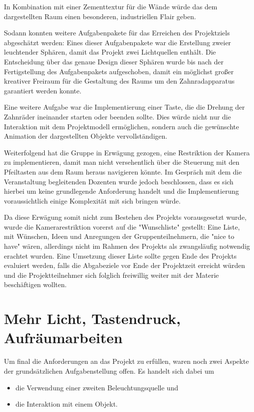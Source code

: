 \documentclass{article}
\begin{document}
In Kombination mit einer Zementtextur für die Wände würde das dem dargestellten Raum einen besonderen, industriellen Flair geben. 

Sodann konnten weitere Aufgabenpakete für das Erreichen des Projektziels abgeschätzt werden: 
Eines dieser Aufgabenpakete war die Erstellung zweier leuchtender Sphären, damit das Projekt zwei Lichtquellen  enthält. 
Die Entscheidung über das genaue Design dieser Sphären wurde bis nach der Fertigstellung des Aufgabenpakets aufgeschoben, damit ein möglichst großer kreativer Freiraum für die Gestaltung des Raums um den Zahnradapparatus garantiert werden konnte. 

Eine weitere Aufgabe war die Implementierung einer Taste, die die Drehung der Zahnräder ineinander starten oder beenden sollte. 
Dies würde nicht nur die Interaktion mit dem Projektmodell ermöglichen, sondern auch die gewünschte Animation der dargestellten Objekte vervollständigen. 

Weiterfolgend hat die Gruppe in Erwägung gezogen, eine Restriktion der Kamera zu implementieren, damit man nicht versehentlich über die Steuerung mit den Pfeiltasten aus dem Raum heraus navigieren könnte. 
Im Gespräch mit dem die Veranstaltung begleitenden Dozenten wurde jedoch beschlossen, dass es sich hierbei um keine grundlegende Anforderung handelt und die Implementierung voraussichtlich einige Komplexität mit sich bringen würde.

Da diese Erwägung somit nicht zum Bestehen des Projekts vorausgesetzt wurde,  wurde die Kamerarestriktion vorerst auf die "Wunschliste" gestellt: 
Eine Liste, mit Wünschen, Ideen und Anregungen der Gruppenteilnehmern, die "nice to have" wären, allerdings nicht im Rahmen des Projekts als zwangsläufig notwendig erachtet wurden. 
Eine Umsetzung dieser Liste sollte gegen Ende des Projekts evaluiert werden, falls die Abgabeziele vor Ende der Projektzeit erreicht würden und die Projektteilnehmer sich folglich freiwillig weiter mit der Materie beschäftigen wollten. 





\section{Mehr Licht, Tastendruck, Aufräumarbeiten}
Um final die Anforderungen an das Projekt zu erfüllen, waren noch zwei Aspekte der grundsätzlichen Aufgabenstellung offen. 
Es handelt sich dabei um 
\begin{itemize}
    \item die Verwendung einer zweiten Beleuchtungsquelle und
    \item die Interaktion mit einem Objekt. 
\end{itemize}
\end{document}
